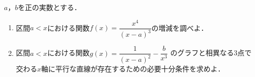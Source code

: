 \documentclass[../../main.tex]{subfiles}
\begin{document}
$a$，$b$を正の実数とする．
\begin{enumerate}
  \item 区間$a<x$における関数$\displaystyle f(x)=\dfrac{x^4}{(x-a)^3}$の増減を調べよ．
  \item 区間$a<x$における関数$\displaystyle g(x)=\dfrac{1}{(x-a)^2}-\dfrac{b}{x^3}$
    のグラフと相異なる3点で交わる$x$軸に平行な直線が存在するための必要十分条件を求めよ．
\end{enumerate}
\end{document}
